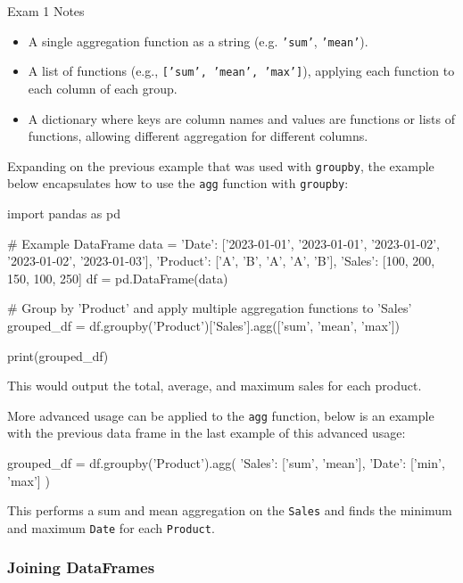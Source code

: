 \begin{examnotes}{Exam 1 Notes}
    \begin{itemize}
        \item A single aggregation function as a string (e.g. \texttt{'sum'}, \texttt{'mean'}).
        \item A list of functions (e.g., \texttt{['sum', 'mean', 'max']}), applying each function to each column of each group.
        \item A dictionary where keys are column names and values are functions or lists of functions, allowing different aggregation for different columns.
    \end{itemize}

    \begin{highlight}
        Expanding on the previous example that was used with \texttt{groupby}, the example below encapsulates how to use the \texttt{agg} function with \texttt{groupby}:

    \begin{code}[Python]
    import pandas as pd

    # Example DataFrame
    data = {
        'Date': ['2023-01-01', '2023-01-01', '2023-01-02', '2023-01-02', '2023-01-03'],
        'Product': ['A', 'B', 'A', 'A', 'B'],
        'Sales': [100, 200, 150, 100, 250]
    }
    df = pd.DataFrame(data)
    
    # Group by 'Product' and apply multiple aggregation functions to 'Sales'
    grouped_df = df.groupby('Product')['Sales'].agg(['sum', 'mean', 'max'])
    
    print(grouped_df)        
    \end{code}
    This would output the total, average, and maximum sales for each product.

    More advanced usage can be applied to the \texttt{agg} function, below is an example with the previous data frame in the last example of this advanced usage:

    \begin{code}[Python]
    grouped_df = df.groupby('Product').agg({
        'Sales': ['sum', 'mean'],
        'Date': ['min', 'max']
    })        
    \end{code}
    This performs a sum and mean aggregation on the \texttt{Sales} and finds the minimum and maximum \texttt{Date} for each \texttt{Product}.
    \end{highlight}

    \subsubsection*{Joining DataFrames}


\end{examnotes}

